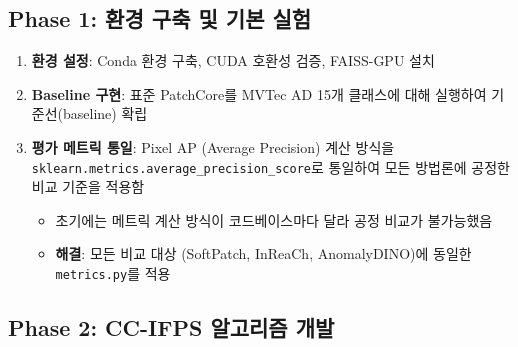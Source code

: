 \documentclass[11pt,a4paper]{article}
\begin{document}
\subsection{Phase 1: 환경 구축 및 기본 실험}

\begin{enumerate}[leftmargin=2em]
  \item \textbf{환경 설정}: Conda 환경 구축, CUDA 호환성 검증, FAISS-GPU 설치
  \item \textbf{Baseline 구현}: 표준 PatchCore를 MVTec AD 15개 클래스에 대해 실행하여 기준선(baseline) 확립
  \item \textbf{평가 메트릭 통일}: Pixel AP (Average Precision) 계산 방식을 \texttt{sklearn.metrics.average\_precision\_score}로 통일하여 모든 방법론에 공정한 비교 기준을 적용함
  \begin{itemize}
    \item 초기에는 메트릭 계산 방식이 코드베이스마다 달라 공정 비교가 불가능했음
    \item \textbf{해결}: 모든 비교 대상 (SoftPatch, InReaCh, AnomalyDINO)에 동일한 \texttt{metrics.py}를 적용
  \end{itemize}
\end{enumerate}

\subsection{Phase 2: CC-IFPS 알고리즘 개발}
\end{document}
